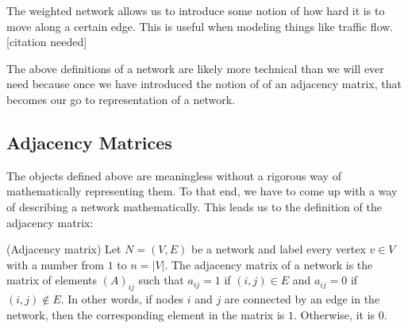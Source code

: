 The weighted network allows us to introduce some notion of how hard it is to move along a certain edge. This is useful when modeling things like traffic flow. [citation needed]

The above definitions of a network are likely more technical than we will ever need because once we have introduced the notion of of an adjacency matrix, that becomes our go to representation of a network.

\subsection{Adjacency Matrices}
The objects defined above are meaningless without a rigorous way of mathematically representing them. To that end, we have to come up with a way of describing a network mathematically. This leads us to the definition of the adjacency matrix:

\begin{definition}{(Adjacency matrix)}
    Let $N = (V, E)$ be a network and label every vertex $v \in V$ with a number from $1$ to $n = |V|$. The adjacency matrix of a network is the matrix of elements $(A)_{ij}$ such that $a_{ij} = 1$ if $(i, j) \in E$ and $a_{ij} = 0$ if $(i, j) \notin E$. In other words, if nodes $i$ and $j$ are connected by an edge in the network, then the corresponding element in the matrix is $1$. Otherwise, it is $0$.\label{def:adjacency_matrix}\cite[111]{newman10}
\end{definition}

